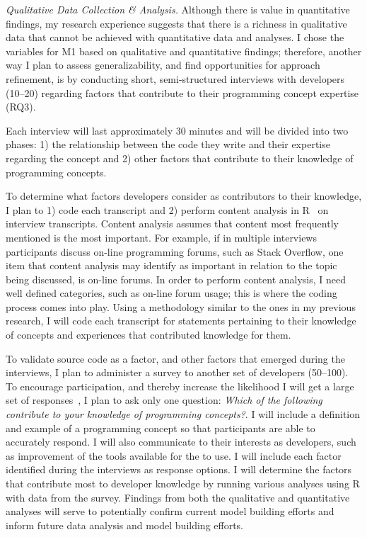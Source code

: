 \documentclass{llncs}
\begin{document}
\vspace{0.5em}

\noindent\textit{Qualitative Data Collection \& Analysis.}
Although there is value in quantitative findings, my research experience suggests that there is a richness in qualitative data that cannot be achieved with quantitative data and analyses.
I chose the variables for M1 based on qualitative and quantitative findings; therefore, another way I plan to assess generalizability, and find opportunities for approach refinement, is by conducting short, semi-structured interviews with developers (10--20) regarding factors that contribute to their programming concept expertise (RQ3). 

Each interview will last approximately 30 minutes and will be divided into two phases: 1) the relationship between the code they write and their expertise regarding the concept and 2) other factors that contribute to their knowledge of programming concepts.  

To determine what factors developers consider as contributors to their knowledge, I plan to 1) code each transcript and 2) perform content analysis in R~\cite{RSoftware} on interview transcripts. Content analysis assumes that content most frequently mentioned is the most important. For example, if in multiple interviews participants discuss on-line programming forums, such as Stack Overflow, one item that content analysis may identify as important in relation to the topic being discussed, is on-line forums. In order to perform content analysis, I need well defined categories, such as on-line forum usage; this is where the coding process comes into play. Using a methodology similar to the ones in my previous research, I will code each transcript for statements pertaining to their knowledge of concepts and experiences that contributed knowledge for them. 

To validate source code as a factor, and other factors that emerged during the interviews, I plan to administer a survey to another set of developers (50--100). To encourage participation, and thereby increase the likelihood I will get a large set of responses~\cite{smith2013improving}, I plan to ask only one question: \emph{Which of the following contribute to your knowledge of programming concepts?}. I will include a definition and example of a programming concept so that participants are able to accurately respond. I will also communicate to their interests as developers, such as improvement of the tools available for the to use.
I will include each factor identified during the interviews as response options.
I will determine the factors that contribute most to developer knowledge by running various analyses using R with data from the survey. Findings from both the qualitative and quantitative analyses will serve to potentially confirm current model building efforts and inform future data analysis and model building efforts.
\end{document}
